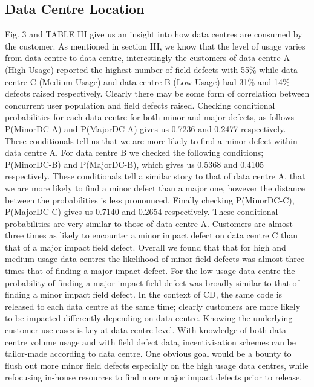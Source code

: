 \documentclass[conference]{IEEEtran}
\begin{document}
\subsection{Data Centre Location}
Fig. 3 and TABLE III give us an insight into how data centres are consumed by the customer. As mentioned in section III, we know that the level of usage varies from data centre to data centre, interestingly the customers of data centre A (High Usage) reported the highest number of field defects with 55\% while data centre C (Medium Usage) and data centre B (Low Usage) had 31\% and 14\% defects raised respectively. Clearly there may be some form of correlation between concurrent user population and field defects raised. 
Checking conditional probabilities for each data centre for both minor and major defects, as follows P(Minor\textbar DC-A) and P(Major\textbar DC-A) gives us 0.7236 and 0.2477 respectively. These conditionals tell us that we are more likely to find a minor defect within data centre A. For data centre B we checked the following conditions; P(Minor\textbar DC-B) and P(Major\textbar DC-B), which gives us 0.5368 and 0.4105 respectively. These conditionals tell a similar story to that of data centre A, that we are more likely to find a minor defect than a major one, however the distance between the probabilities is less pronounced. Finally checking P(Minor\textbar DC-C), P(Major\textbar DC-C) gives us 0.7140 and 0.2654 respectively. These conditional probabilities are very similar to those of data centre A. Customers are almost three times as likely to encounter a minor impact defect on data centre C than that of a major impact field defect.
Overall we found that that for high and medium usage data centres the likelihood of minor field defects was almost three times that of finding a major impact defect. For the low usage data centre the probability of finding a major impact field defect was broadly similar to that of finding a minor impact field defect.
In the context of CD, the same code is released to each data centre at the same time; clearly customers are more likely to be impacted differently depending on data centre. Knowing the underlying customer use cases is key at data centre level.
With knowledge of both data centre volume usage and with field defect data, incentivisation schemes can be tailor-made according to data centre. One obvious goal would be a bounty to flush out more minor field defects especially on the high usage data centres, while refocusing in-house resources to find more major impact defects prior to release. 
\end{document}
